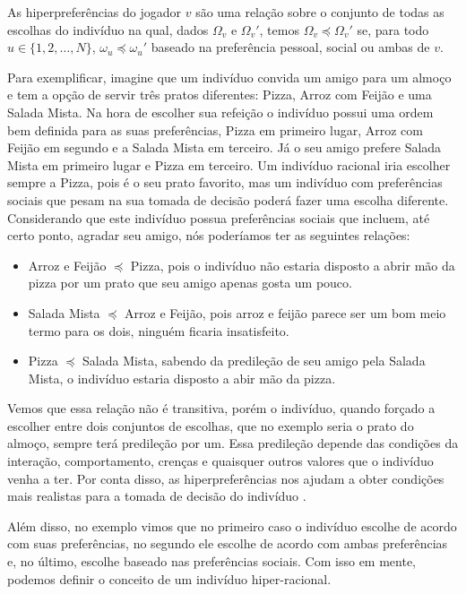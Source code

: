 \begin{definition}
    \label{defHiperPreferencias}
    As hiperpreferências do jogador $v$ são uma relação sobre o conjunto de todas as escolhas do indivíduo na qual, dados $\Omega_v$ e $\Omega_v'$, temos $\Omega_v\preceq\Omega_v'$ se, para todo $u\in\{1,2,\dots,N\}$, $\omega_u\preceq\omega_u'$ baseado na preferência pessoal, social ou ambas de $v$.
\end{definition}

Para exemplificar, imagine que um indivíduo convida um amigo para um almoço e tem a opção de servir três pratos diferentes: Pizza, Arroz com Feijão e uma Salada Mista. Na hora de escolher sua refeição o indivíduo possui uma ordem bem definida para as suas preferências, Pizza em primeiro lugar, Arroz com Feijão em segundo e a Salada Mista em terceiro. Já o seu amigo prefere Salada Mista em primeiro lugar e Pizza em terceiro. Um indivíduo racional iria escolher sempre a Pizza, pois é o seu prato favorito, mas um indivíduo com preferências sociais que pesam na sua tomada de decisão poderá fazer uma escolha diferente. Considerando que este indivíduo possua preferências sociais que incluem, até certo ponto, agradar seu amigo, nós poderíamos ter as seguintes relações:

\begin{itemize}
    \item Arroz e Feijão $\preceq$ Pizza, pois o indivíduo não estaria disposto a abrir mão da pizza por um prato que seu amigo apenas gosta um pouco.
    \item Salada Mista $\preceq$ Arroz e Feijão, pois arroz e feijão parece ser um bom meio termo para os dois, ninguém ficaria insatisfeito.
    \item Pizza $\preceq$ Salada Mista, sabendo da predileção de seu amigo pela Salada Mista, o indivíduo estaria disposto a abir mão da pizza.
\end{itemize}

Vemos que essa relação não é transitiva, porém o indivíduo, quando forçado a escolher entre dois conjuntos de escolhas, que no exemplo seria o prato do almoço, sempre terá predileção por um. Essa predileção depende das condições da interação, comportamento, crenças e quaisquer outros valores que o indivíduo venha a ter. Por conta disso, as hiperpreferências nos ajudam a obter condições mais realistas para a tomada de decisão do indivíduo \cite{askari2019behavioral}.

Além disso, no exemplo vimos que no primeiro caso o indivíduo escolhe de acordo com suas preferências, no segundo ele escolhe de acordo com ambas preferências e, no último, escolhe baseado nas preferências sociais. Com isso em mente, podemos definir o conceito de um indivíduo hiper-racional.

